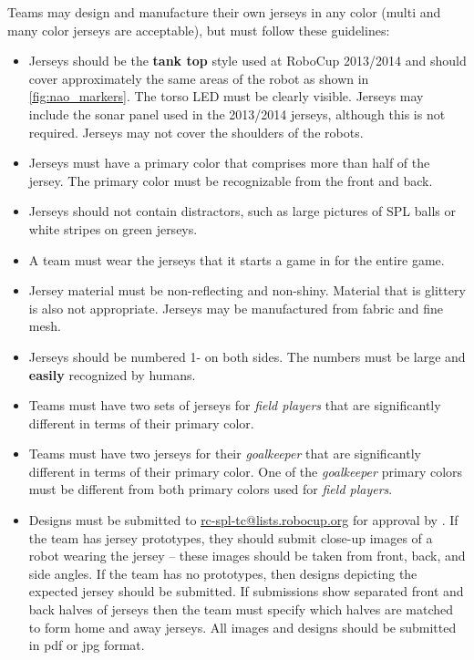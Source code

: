 Teams may design and manufacture their own jerseys in any color (multi and many color jerseys are acceptable), but must follow these guidelines:
\begin{itemize}
\item Jerseys should be the \textbf{tank top} style used at RoboCup 2013/2014 and should cover approximately the same areas of the robot as shown in \cref{fig:nao_markers}. The torso LED must be clearly visible. Jerseys may include the sonar panel used in the 2013/2014 jerseys, although this is not required. Jerseys may not cover the shoulders of the robots.
\item Jerseys must have a primary color that comprises more than half of the jersey.  The primary color must be recognizable from the front and back.
\item Jerseys should not contain distractors, such as large pictures of SPL balls or white stripes on green jerseys.
\item A team must wear the jerseys that it starts a game in for the entire game.
\item Jersey material must be non-reflecting and non-shiny.  Material that is glittery is also not appropriate.  Jerseys may be manufactured from fabric and fine mesh.
\item Jerseys should be numbered 1-{\MaxJerseyNumber} on both sides.  The numbers must be large and {\bf easily} recognized by humans.
\item Teams must have two sets of jerseys for \emph{field players} that are significantly different in terms of their primary color.
\item Teams must have two jerseys for their \emph{goalkeeper} that are significantly different in terms of their primary color.  One of the \emph{goalkeeper} primary colors must be different from both primary colors used for \emph{field players}.
\item Designs must be submitted to \url{rc-spl-tc@lists.robocup.org} for approval by \DTMdate{\JerseyApproveSubmissionDate}. If the team has jersey prototypes, they should submit close-up images of a robot wearing the jersey -- these images should be taken from front, back, and side angles.  If the team has no prototypes, then designs depicting the expected jersey should be submitted.  If submissions show separated front and back halves of jerseys then the team must specify which halves are matched to form home and away jerseys.  All images and designs should be submitted in pdf or jpg format.
\end{itemize}

